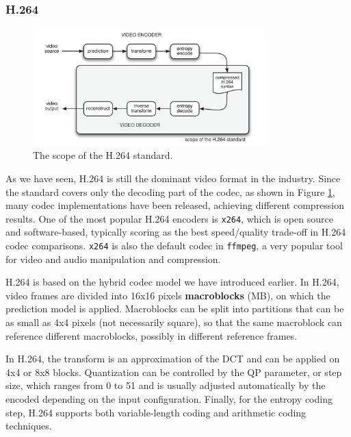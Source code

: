 \subsubsection{H.264}
\label{sec:bg/compression/codecs/h264}

\begin{figure}
	\centering
	
	\includegraphics[width=0.8\textwidth]{res/h264_scope.png}
	
	\caption{The scope of the H.264 standard.}
	\label{fig:h264_scope}
\end{figure}

As we have seen, H.264 is still the dominant video format in the industry. Since the standard covers only the decoding part of the codec, as shown in Figure \ref{fig:h264_scope}, many codec implementations have been released, achieving different compression results. One of the most popular H.264 encoders is \texttt{x264}, which is open source and software-based, typically scoring as the best speed/quality trade-off in H.264 codec comparisons.\cite{msu2021} \texttt{x264} is also the default codec in \texttt{ffmpeg}, a very popular tool for video and audio manipulation and compression.

H.264 is based on the hybrid codec model we have introduced earlier. In H.264, video frames are divided into 16x16 pixels \textbf{macroblocks} (MB), on which the prediction model is applied. Macroblocks can be split into partitions that can be as small as 4x4 pixels (not necessarily square), so that the same macroblock can reference different macroblocks, possibly in different reference frames.

In H.264, the transform is an approximation of the DCT and can be applied on 4x4 or 8x8 blocks. Quantization can be controlled by the QP parameter, or step size, which ranges from 0 to 51 and is usually adjusted automatically by the encoded depending on the input configuration. Finally, for the entropy coding step, H.264 supports both variable-length coding and arithmetic coding techniques.

